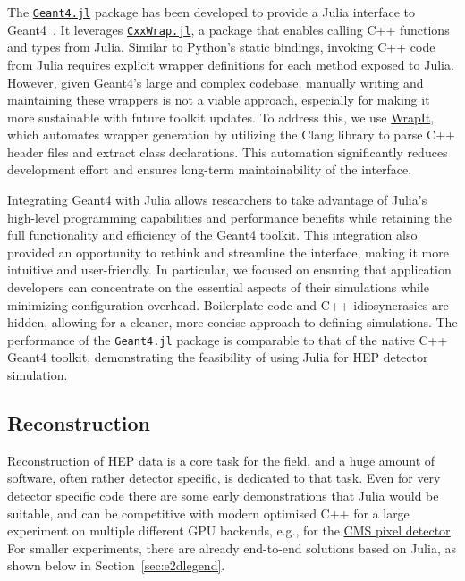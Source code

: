 \documentclass{webofc}
\begin{document}
The \href{https://github.com/JuliaHEP/Geant4.jl}{\texttt{Geant4.jl}} package has
been developed to provide a Julia interface to Geant4~\cite{ALLISON2016186}. It
leverages
\href{https://github.com/JuliaInterop/CxxWrap.jl}{\texttt{CxxWrap.jl}}, a
package that enables calling C++ functions and types from Julia. Similar to
Python's static bindings, invoking C++ code from Julia requires explicit wrapper
definitions for each method exposed to Julia. However, given Geant4's large and
complex codebase, manually writing and maintaining these wrappers is not a
viable approach, especially for making it more sustainable with future toolkit
updates. To address this, we use
\href{https://github.com/grasph/wrapit}{WrapIt}, which automates wrapper
generation by utilizing the Clang library to parse C++ header files and extract
class declarations. This automation significantly reduces development effort and
ensures long-term maintainability of the interface.

Integrating Geant4 with Julia allows researchers to take advantage of Julia's
high-level programming capabilities and performance benefits while retaining the
full functionality and efficiency of the Geant4 toolkit. This integration also
provided an opportunity to rethink and streamline the interface, making it more
intuitive and user-friendly. In particular, we focused on ensuring that
application developers can concentrate on the essential aspects of their
simulations while minimizing configuration overhead. Boilerplate code and C++
idiosyncrasies are hidden, allowing for a cleaner, more concise approach to
defining simulations. The performance of the \texttt{Geant4.jl} package is
comparable to that of the native C++ Geant4 toolkit, demonstrating the
feasibility of using Julia for HEP detector simulation.

\subsection{Reconstruction}

Reconstruction of HEP data is a core task for the field, and a huge amount of
software, often rather detector specific, is dedicated to that task. Even for
very detector specific code there are some early demonstrations that Julia would
be suitable, and can be competitive with modern optimised C++ for a large
experiment on multiple different GPU backends, e.g., for the \href{https://indico.cern.ch/event/1410341/contributions/6135572/}{CMS pixel
detector}. For smaller experiments, there are already
end-to-end solutions based on Julia, as shown below in
Section~\ref{sec:e2dlegend}.
\end{document}
